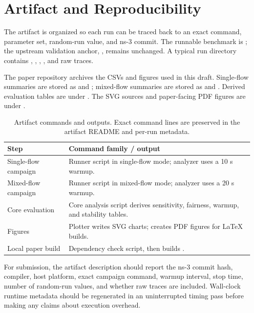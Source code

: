 \section{Artifact and Reproducibility}

The artifact is organized so each run can be traced back to an exact command, parameter set, random-run value, and ns-3 commit. The runnable benchmark is \TcpAqmBenchmark{}; the upstream validation anchor, \TcpValidation{}, remains unchanged. A typical run directory contains \MetadataFile{}, \CommandFile{}, \StdoutFile{}, \StderrFile{}, and raw \TraceGlob{} traces.

The paper repository archives the CSVs and figures used in this draft. Single-flow summaries are stored as \FullSummaryCsv{} and \FullSummaryAggregateCsv{}; mixed-flow summaries are stored as \MixedSummaryCsv{} and \MixedSummaryAggregateCsv{}. Derived evaluation tables are under \CoreEvalDir{}. The SVG sources and paper-facing PDF figures are under \PaperFigureDir{}.\PaperArtifactPaths{}

\begin{table}[t]
  \caption{Artifact commands and outputs. Exact command lines are preserved in the artifact README and per-run metadata.}
  \label{tab:artifact-commands}
  \centering
  \small
  \begin{tabularx}{\columnwidth}{@{}lX@{}}
    \toprule
    Step & Command family / output \\
    \midrule
    Single-flow campaign & Runner script in single-flow mode; analyzer uses a 10 s warmup. \\
    Mixed-flow campaign & Runner script in mixed-flow mode; analyzer uses a 20 s warmup. \\
    Core evaluation & Core analysis script derives sensitivity, fairness, warmup, and stability tables. \\
    Figures & Plotter writes SVG charts; \RsvgConvert{} creates PDF figures for LaTeX builds. \\
    Local paper build & Dependency check script, then \Latexmk{} builds \MainTex{}. \\
    \bottomrule
  \end{tabularx}
\end{table}

For submission, the artifact description should report the ns-3 commit hash, compiler, host platform, exact campaign command, warmup interval, stop time, number of random-run values, and whether raw traces are included. Wall-clock runtime metadata should be regenerated in an uninterrupted timing pass before making any claims about execution overhead.
